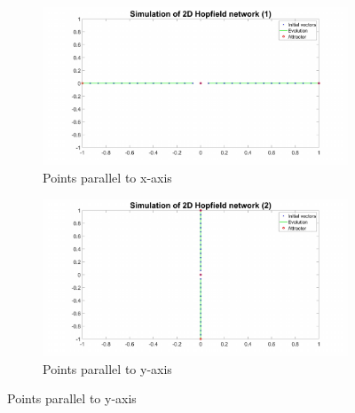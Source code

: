 \documentclass{article}
\begin{document}
\begin{figure}[h!]
\begin{subfigure}[b]{.49\textwidth}
  \centering
  \includegraphics[width=\linewidth]{lab2/2d1.pdf}
  \caption{Points parallel to x-axis}
  \label{fig:xaxia}
\end{subfigure}
\hfill
\begin{subfigure}[b]{.49\textwidth}
  \centering
  \includegraphics[width=\linewidth]{lab2/2d2.pdf}
  \caption{Points parallel to y-axis}
  \label{fig:yaxis}
\end{subfigure}



\end{figure}
\end{document}
